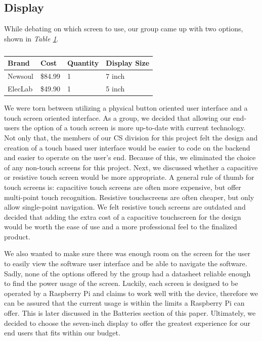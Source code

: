 \subsection{Display}

While debating on which screen to use, our group came up with two options, shown in \textit{Table \ref{Tab:display_brand}}.

\begin{table}[]
  \centering
  \begin{tabular}{|l|l|l|l|}
    \hline
    Brand   & Cost    & Quantity & Display Size \\ \hline
    Newsoul & \$84.99 & 1        & 7 inch       \\ \hline
    ElecLab & \$49.90 & 1        & 5 inch       \\ \hline
  \end{tabular}
  \caption{}
  \label{Tab:display_brand}
\end{table}

We were torn between utilizing a physical button oriented user interface and a touch screen oriented interface. As a group, we decided that allowing our end-users the option of a touch screen is more up-to-date with current technology. Not only that, the members of our CS division for this project felt the design and creation of a touch based user interface would be easier to code on the backend and easier to operate on the user’s end. Because of this, we eliminated the choice of any non-touch screens for this project. Next, we discussed whether a capacitive or resistive touch screen would be more appropriate. A general rule of thumb for touch screens is: capacitive touch screens are often more expensive, but offer multi-point touch recognition. Resistive touchscreens are often cheaper, but only allow single-point navigation. We felt resistive touch screens are outdated and decided that adding the extra cost of a capacitive touchscreen for the design would be worth the ease of use and a more professional feel to the finalized product.

We also wanted to make sure there was enough room on the screen for the user to easily view the software user interface and be able to navigate the software. Sadly, none of the options offered by the group had a datasheet reliable enough to find the power usage of the screen. Luckily, each screen is designed to be operated by a Raspberry Pi and claims to work well with the device, therefore we can be assured that the current usage is within the limits a Raspberry Pi can offer. This is later discussed in the Batteries section of this paper. Ultimately, we decided to choose the seven-inch display to offer the greatest experience for our end users that fits within our budget.

